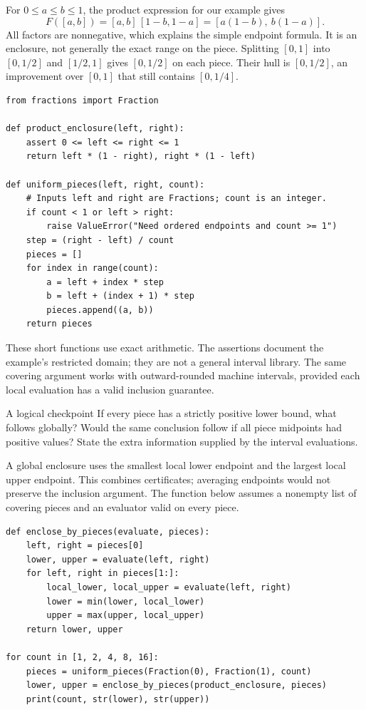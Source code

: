 For $0\leq a\leq b\leq1$, the product expression for our example gives
\[
 F([a,b])=[a,b]\,[1-b,1-a]=[a(1-b),\ b(1-a)].
\]
All factors are nonnegative, which explains the simple endpoint formula.
It is an enclosure, not generally the exact range on the piece. Splitting
$[0,1]$ into $[0,1/2]$ and $[1/2,1]$ gives $[0,1/2]$ on each piece. Their
hull is $[0,1/2]$, an improvement over $[0,1]$ that still contains $[0,1/4]$.

\begin{lstlisting}
from fractions import Fraction

def product_enclosure(left, right):
    assert 0 <= left <= right <= 1
    return left * (1 - right), right * (1 - left)

def uniform_pieces(left, right, count):
    # Inputs left and right are Fractions; count is an integer.
    if count < 1 or left > right:
        raise ValueError("Need ordered endpoints and count >= 1")
    step = (right - left) / count
    pieces = []
    for index in range(count):
        a = left + index * step
        b = left + (index + 1) * step
        pieces.append((a, b))
    return pieces
\end{lstlisting}

These short functions use exact arithmetic. The assertions document the
example's restricted domain; they are not a general interval library.
The same covering argument works with outward-rounded machine intervals,
provided each local evaluation has a valid inclusion guarantee.

\begin{question}{A logical checkpoint}
If every piece has a strictly positive lower bound, what follows globally?
Would the same conclusion follow if all piece midpoints had positive values?
State the extra information supplied by the interval evaluations.
\end{question}

\newpage
{}

A global enclosure uses the smallest local lower endpoint and the largest
local upper endpoint. This combines certificates; averaging endpoints would
not preserve the inclusion argument. The function below assumes a nonempty
list of covering pieces and an evaluator valid on every piece.

\begin{lstlisting}
def enclose_by_pieces(evaluate, pieces):
    left, right = pieces[0]
    lower, upper = evaluate(left, right)
    for left, right in pieces[1:]:
        local_lower, local_upper = evaluate(left, right)
        lower = min(lower, local_lower)
        upper = max(upper, local_upper)
    return lower, upper

for count in [1, 2, 4, 8, 16]:
    pieces = uniform_pieces(Fraction(0), Fraction(1), count)
    lower, upper = enclose_by_pieces(product_enclosure, pieces)
    print(count, str(lower), str(upper))
\end{lstlisting}

